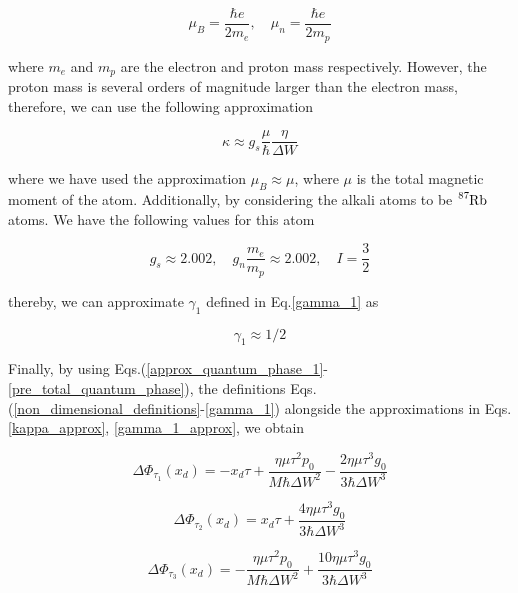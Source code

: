 \documentclass{article}
\begin{document}
\begin{equation}
\mu_{B} = \frac{\hbar e}{2 m_{e}} \mathrm{,}\quad \mu_{n} = \frac{\hbar e}{2 m_{p}}
\end{equation}

where $m_{e}$ and $m_{p}$ are the electron and proton mass respectively. However, the proton mass is several orders of magnitude larger than the electron mass, therefore, we can use the following approximation

\begin{equation}\label{kappa_approx}
\kappa \approx g_{s}\frac{\mu }{\hbar} \frac{\eta}{\Delta W}
\end{equation}

where we have used the approximation $\mu_{B} \approx \mu$, where $\mu$ is the total magnetic moment of the atom. Additionally, by considering the alkali atoms to be $\ce{^{87}_{}Rb}$ atoms. We have the following values for this atom \cite{KAUSHALSK1970,Bunge1993}

\begin{equation}
g_{s} \approx 2.002 \mathrm{,}\quad g_{n} \frac{m_{e}}{m_{p}} \approx 2.002 \mathrm{,}\quad I = \frac{3}{2}
\end{equation}

thereby, we can approximate $\gamma_{1}$ defined in Eq.\ref{gamma_1} as

\begin{equation}\label{gamma_1_approx}
\gamma_{1} \approx 1/2
\end{equation}

Finally, by using Eqs.(\ref{approx_quantum_phase_1}-\ref{pre_total_quantum_phase}), the definitions Eqs.(\ref{non_dimensional_definitions}-\ref{gamma_1}) alongside the approximations in Eqs. \ref{kappa_approx}, \ref{gamma_1_approx}, we obtain

\begin{equation}
\Delta \Phi_{\tau_{1}}(x_{d}) = -x_{d}\tau + \frac{\eta \mu \tau^{2} p_{0}}{M \hbar \Delta W^{2}} - \frac{2 \eta \mu \tau^{3} g_{0}}{3 \hbar \Delta W^{3}}
\end{equation}

\begin{equation}
\Delta \Phi_{\tau_{2}}(x_{d}) = x_{d}\tau + \frac{4 \eta \mu \tau^{3} g_{0}}{3 \hbar \Delta W^{3}}
\end{equation}

\begin{equation}
\Delta \Phi_{\tau_{3}}(x_{d}) = -\frac{\eta \mu \tau^{2} p_{0}}{M \hbar \Delta W^{2}} + \frac{10 \eta \mu \tau^{3} g_{0}}{3 \hbar \Delta W^{3}}
\end{equation}
\end{document}
